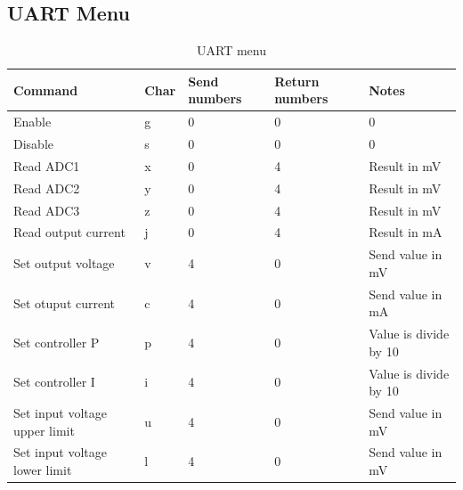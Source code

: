 \documentclass[12pt]{article}%
\begin{document}
\subsection{UART Menu}
\begin{table}[H]
   \centering
   \caption{UART menu}
   \label{tab:menu}
   \begin{tabular}{|p{4cm}|p{1.2cm}|p{1.8cm}|p{1.8cm}|p{4cm}|}
   \hline
      \textbf{Command}              & \textbf{Char}   &  \textbf{Send numbers}   &  \textbf{Return numbers}  &  \textbf{Notes}\\ \hline
      Enable                        & g               &  0                       &  0                        &  0                        \\ \hline
      Disable                       & s               &  0                       &  0                        &  0                        \\ \hline
      Read ADC1                     & x               &  0                       &  4                        &  Result in mV                         \\ \hline
      Read ADC2                     & y               &  0                       &  4                        &  Result in mV                         \\ \hline
      Read ADC3                     & z               &  0                       &  4                        &  Result in mV                         \\ \hline
      Read output current           & j               &  0                       &  4                        &  Result in mA              \\ \hline
      Set output voltage            & v               &  4                       &  0                        &  Send value in mV         \\ \hline
      Set otuput current            & c               &  4                       &  0                        &  Send value in mA    \\ \hline
      Set controller P              & p               &  4                       &  0                        &  Value is divide by 10    \\ \hline
      Set controller I              & i               &  4                       &  0                        &  Value is divide by 10         \\ \hline
      Set input voltage upper limit & u               &  4                       &  0                        &  Send value in mV             \\ \hline
      Set input voltage lower limit & l               &  4                       &  0                        &  Send value in mV         \\ \hline
   \end{tabular}
\end{table}

       
\end{document}
